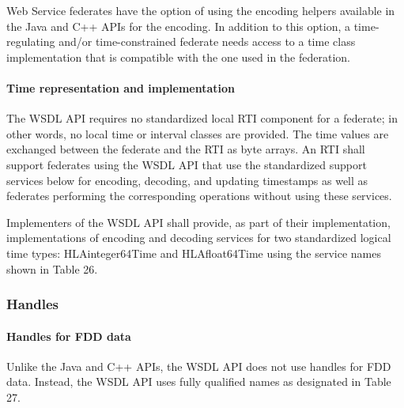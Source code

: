 \clearpage

\begin{compactstdpage}
    Web Service federates have the option of using the encoding helpers available in the Java and C++ APIs for the encoding. In addition to this option, a time-regulating and/or time-constrained federate needs access to a time class implementation that is compatible with the one used in the federation.

    \paragraph{Time representation and implementation}

    The WSDL API requires no standardized local RTI component for a federate; in other words, no local time or interval classes are provided. The time values are exchanged between the federate and the RTI as byte arrays. An RTI shall support federates using the WSDL API that use the standardized support services below for encoding, decoding, and updating timestamps as well as federates performing the corresponding operations without using these services.

    Implementers of the WSDL API shall provide, as part of their implementation, implementations of encoding and decoding services for two standardized logical time types: HLAinteger64Time and HLAfloat64Time using the service names shown in Table 26.

    \cxiitabletwentysix

    \subsubsection{Handles}

    \paragraph{Handles for FDD data}

    Unlike the Java and C++ APIs, the WSDL API does not use handles for FDD data. Instead, the WSDL API uses fully qualified names as designated in Table 27.

    \cxiitabletwentysevena

\end{compactstdpage}

\clearpage

